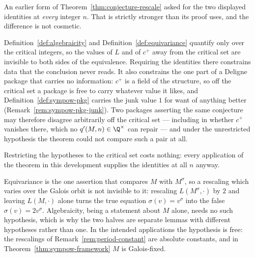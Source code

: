 \begin{remark}
  \label{rem:rescale-critical-only}
  An earlier form of Theorem~\ref{thm:conjecture-rescale} asked for the two displayed
  identities at \emph{every} integer $n$. That is strictly stronger than its proof uses, and
  the difference is not cosmetic.

  Definition~\ref{def:algebraicity} and Definition~\ref{def:equivariance} quantify only over
  the critical integers, so the values of $L$ and of $c^{+}$ away from the critical set are
  invisible to both sides of the equivalence. Requiring the identities there constrains data
  that the conclusion never reads. It also constrains the one part of a Deligne package that
  carries no information: $c^{+}$ is a field of the structure, so off the critical set a
  package is free to carry whatever value it likes, and Definition~\ref{def:sympow-pkg}
  carries the junk value $1$ for want of anything better
  (Remark~\ref{rem:sympow-pkg-junk}). Two packages asserting the same conjecture may
  therefore disagree arbitrarily off the critical set --- including in whether $c^{+}$
  vanishes there, which no $q'(M,n) \in \Q^{\times}$ can repair --- and under the
  unrestricted hypothesis the theorem could not compare such a pair at all.

  Restricting the hypotheses to the critical set costs nothing: every application of the
  theorem in this development supplies the identities at all $n$ anyway.
\end{remark}

\begin{remark}
  \label{rem:rescale-galois-hyp}
  Equivariance is the one assertion that compares $M$ with $M^{\sigma}$, so a rescaling which
  varies over the Galois orbit is not invisible to it: rescaling $L(M^{\sigma},\cdot)$ by $2$
  and leaving $L(M,\cdot)$ alone turns the true equation $\sigma(v) = v^{\sigma}$ into the
  false $\sigma(v) = 2v^{\sigma}$. Algebraicity, being a statement about $M$ alone, needs no
  such hypothesis, which is why the two halves are separate lemmas with different
  hypotheses rather than one. In the intended applications the hypothesis is free: the
  rescalings of Remark~\ref{rem:period-constant} are absolute constants, and in
  Theorem~\ref{thm:sympow-framework} $M$ is Galois-fixed.
\end{remark}

